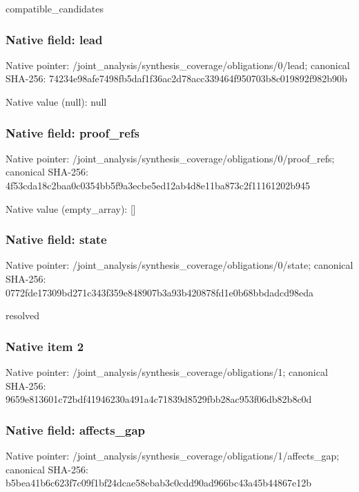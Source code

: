\documentclass[10pt,a4paper]{article}
\begin{document}
\begingroup\raggedright\sloppy compatible\_\allowbreak{}candidates\par\endgroup

\subsubsection{Native field: lead}
Native pointer: /joint\_\allowbreak{}analysis/synthesis\_\allowbreak{}coverage/obligations/0/lead; canonical SHA-256: 74234e98afe7498fb5daf1f36ac2d78acc339464f950703b8c019892f982b90b

Native value (null): null

\subsubsection{Native field: proof\_\allowbreak{}refs}
Native pointer: /joint\_\allowbreak{}analysis/synthesis\_\allowbreak{}coverage/obligations/0/proof\_\allowbreak{}refs; canonical SHA-256: 4f53cda18c2baa0c0354bb5f9a3ecbe5ed12ab4d8e11ba873c2f11161202b945

Native value (empty\_\allowbreak{}array): []

\subsubsection{Native field: state}
Native pointer: /joint\_\allowbreak{}analysis/synthesis\_\allowbreak{}coverage/obligations/0/state; canonical SHA-256: 0772fde17309bd271c343f359e848907b3a93b420878fd1e0b68bbdadcd98eda

\begingroup\raggedright\sloppy resolved\par\endgroup

\subsubsection{Native item 2}
Native pointer: /joint\_\allowbreak{}analysis/synthesis\_\allowbreak{}coverage/obligations/1; canonical SHA-256: 9659e813601c72bdf41946230a491a4c71839d8529fbb28ac953f06db82b8c0d

\subsubsection{Native field: affects\_\allowbreak{}gap}
Native pointer: /joint\_\allowbreak{}analysis/synthesis\_\allowbreak{}coverage/obligations/1/affects\_\allowbreak{}gap; canonical SHA-256: b5bea41b6c623f7c09f1bf24dcae58ebab3c0cdd90ad966bc43a45b44867e12b
\end{document}
